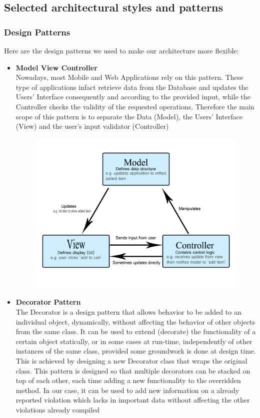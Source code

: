 \documentclass[12pt,a4paper]{article}
\begin{document}
\subsection{Selected architectural styles and patterns}
\subsubsection{Design Patterns}
Here are the design patterns we used to make our architecture more flexible:
\begin{itemize}
\item \textbf{Model View Controller}\\
Nowadays, most Mobile and Web Applications rely on this pattern. These type of applications infact retrieve data from the Database and updates the Users' Interface consequently and according to the provided input, while the Controller checks the validity of the requested operations. Therefore the main scope of this pattern is to separate the Data (Model), the Users' Interface (View) and the user's input validator (Controller)
\begin{figure}[H]
		\centering
		\includegraphics[width=1.0\linewidth]{../assets/images/model-view-controller-light-blue.png}
	\end{figure}
\newpage
\item \textbf{Decorator Pattern}\\
The Decorator is a design pattern that allows behavior to be added to an individual object, dynamically, without affecting the behavior of other objects from the same class. It can be used to extend (decorate) the functionality of a certain object statically, or in some cases at run-time, independently of other instances of the same class, provided some groundwork is done at design time. This is achieved by designing a new Decorator class that wraps the original class. This pattern is designed so that multiple decorators can be stacked on top of each other, each time adding a new functionality to the overridden method. In our case, it can be used to add new information on a already reported violation which lacks in important data without affecting the other violations already compiled

\end{itemize}
\end{document}
